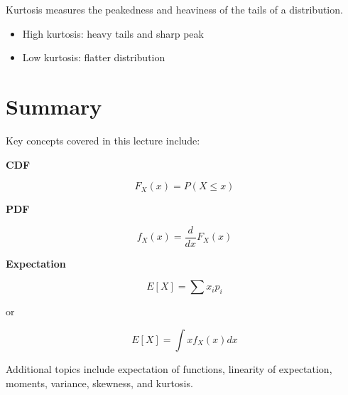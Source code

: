 \documentclass[12pt]{article}
\begin{document}
Kurtosis measures the peakedness and heaviness of the tails of a distribution.

\begin{itemize}
\item High kurtosis: heavy tails and sharp peak
\item Low kurtosis: flatter distribution
\end{itemize}

\section{Summary}

Key concepts covered in this lecture include:

\textbf{CDF}

\[
F_X(x) = P(X \le x)
\]

\textbf{PDF}

\[
f_X(x) = \frac{d}{dx}F_X(x)
\]

\textbf{Expectation}

\[
E[X] = \sum x_i p_i
\]

or

\[
E[X] = \int x f_X(x)dx
\]

Additional topics include expectation of functions, linearity of expectation, moments, variance, skewness, and kurtosis.
\end{document}
